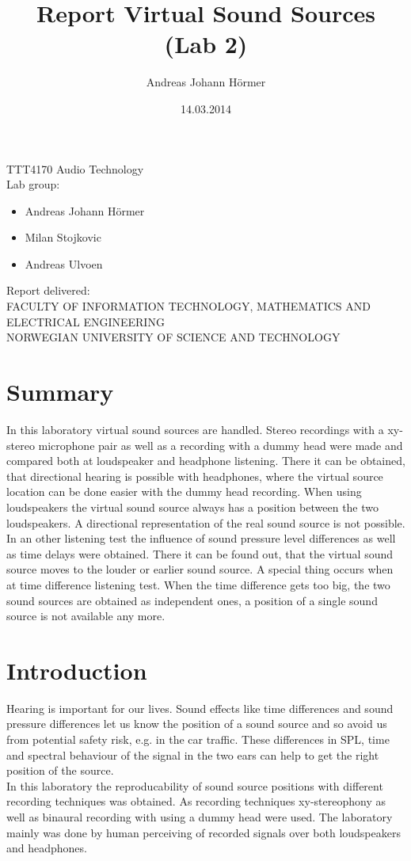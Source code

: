 \documentclass{article}
\title{Report Virtual Sound Sources (Lab 2)}
\author{Andreas Johann H\"ormer}
\date{14.03.2014}
\begin{document}
\thispagestyle{empty}
\maketitle
\thispagestyle{empty}
\begin{center}
TTT4170 Audio Technology\\[3cm]
Lab group:
\begin{itemize}
\item Andreas Johann H\"ormer
\item Milan Stojkovic
\item Andreas Ulvoen\\[3cm]
\end{itemize}
Report delivered: \\[6cm]
FACULTY OF INFORMATION TECHNOLOGY, MATHEMATICS AND ELECTRICAL ENGINEERING\\
NORWEGIAN UNIVERSITY OF SCIENCE AND TECHNOLOGY
\end{center}
\thispagestyle{empty}
\tableofcontents
\thispagestyle{empty}
\newpage
\section*{Summary}
\thispagestyle{empty}
In this laboratory virtual sound sources are handled. Stereo recordings with a xy-stereo microphone pair as well as a recording with a dummy head were made and compared both at loudspeaker and headphone listening. There it can be obtained, that directional hearing is possible with headphones, where the virtual source location can be done easier with the dummy head recording. When using loudspeakers the virtual sound source always has a position between the two loudspeakers. A directional representation of the real sound source is not possible.\\
In an other listening test the influence of sound pressure level differences as well as time delays were obtained. There it can be found out, that the virtual sound source moves to the louder or earlier sound source. A special thing occurs when at time difference listening test. When the time difference gets too big, the two sound sources are obtained as independent ones, a position of a single sound source is not available any more.

\newpage
\setcounter{page}{1}
\section{Introduction}
Hearing is important for our lives. Sound effects like time differences and sound pressure differences let us know the position of a sound source and so avoid us from potential safety risk, e.g. in the car traffic. These differences in SPL, time and spectral behaviour of the signal in the two ears can help to get the right position of the source.\\
In this laboratory the reproducability of sound source positions with different recording techniques was obtained. As recording techniques xy-stereophony as well as binaural recording with using a dummy head were used. The laboratory mainly was done by human perceiving of recorded signals over both loudspeakers and headphones.
\end{document}
